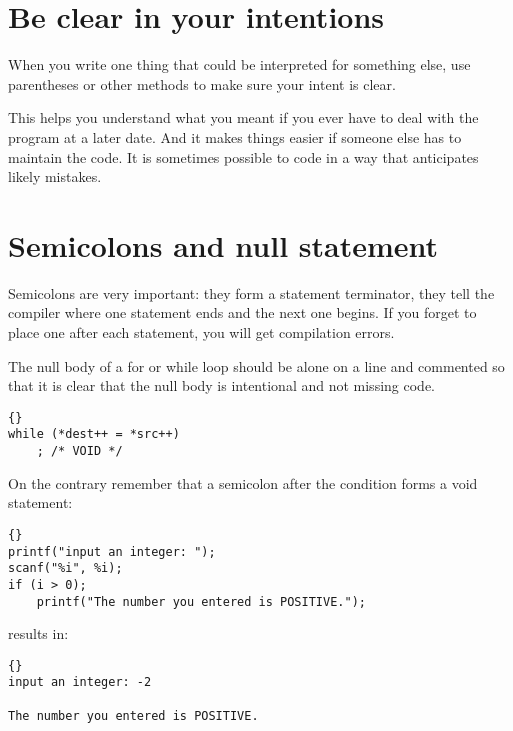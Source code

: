\documentclass{report}
\begin{document}
\section{Be clear in your intentions} 
When you write one thing that could be interpreted for something else, use parentheses or other methods to make sure your intent is clear.

This helps you understand what you meant if you ever have to deal with the program at a later date. And it makes things easier if someone else has to maintain the code. It is sometimes possible to code in a way that anticipates likely mistakes.

\section{Semicolons and null statement}
Semicolons are very important: they form a statement terminator, they tell the compiler where one statement ends and the next one begins. If you forget to place one after each statement, you will get compilation errors.

The null body of a for or while loop should be alone on a line and commented so that it is clear that the null body is intentional and not missing code. 
\begin{lstlisting}{}
while (*dest++ = *src++)
    ; /* VOID */
\end{lstlisting}
On the contrary remember that a semicolon after the condition forms a void statement:
\begin{lstlisting}{}
printf("input an integer: ");
scanf("%i", %i);
if (i > 0);
    printf("The number you entered is POSITIVE.");
\end{lstlisting}
results in:
\begin{lstlisting}{}
input an integer: -2

The number you entered is POSITIVE.
\end{lstlisting}

\end{document}
